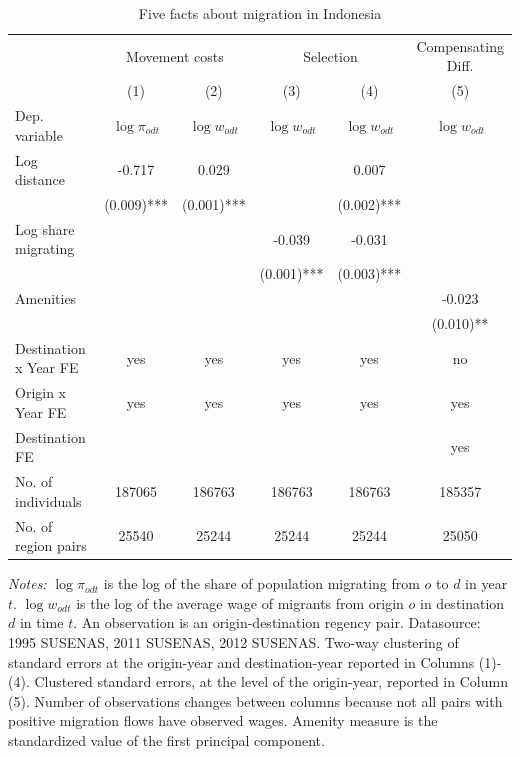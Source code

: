 \begin{table}[hbpt] \begin{center}\begin{threeparttable}\caption{ {Five facts about migration in Indonesia    }} \begin{tabular}{l*{5}c} \toprule
&\multicolumn{2}{c}{Movement costs}&\multicolumn{2}{c}{Selection}&\multicolumn{1}{c}{Compensating Diff.}\\
&(1)&(2)&(3)&(4)&(5)\\
Dep. variable&$\log \pi_{odt}$&$\log w_{odt}$ &$\log w_{odt}$ &$\log w_{odt}$ &$\log w_{odt}$ \\
\midrule
Log distance&-0.717&0.029&&0.007&\\
&(0.009)***&(0.001)***&&(0.002)***&\\
Log share migrating&&&-0.039&-0.031&\\
&&&(0.001)***&(0.003)***&\\
Amenities&&&&&-0.023\\
&&&&&(0.010)**\\
\midrule
Destination x Year FE&yes&yes&yes&yes&no\\
Origin x Year FE&yes&yes&yes&yes&yes\\
Destination FE&&&&&yes\\
No. of individuals&187065&186763&186763&186763&185357\\
No. of region pairs&25540&25244&25244&25244&25050\\
\bottomrule \end{tabular} \label{Five facts about migration in Indonesia    } \begin{tablenotes} \item {\footnotesize \emph{Notes: } $\log \pi_{odt}$ is the log of the share of population migrating from $ o $ to $ d $ in year $ t $. $\log w_{odt}$ is the log of the average wage of migrants from origin $ o $ in destination $ d $ in time $ t $. An observation is an origin-destination regency pair. Datasource: 1995 SUSENAS, 2011 SUSENAS, 2012 SUSENAS. Two-way clustering of standard errors at the origin-year and destination-year reported in Columns (1)-(4). Clustered standard errors, at the level of the origin-year, reported in Column (5). Number of observations changes between columns because not all pairs with positive migration flows have observed wages. Amenity measure is the standardized value of the first principal component. } \end{tablenotes} \end{threeparttable} \end{center} \end{table}
